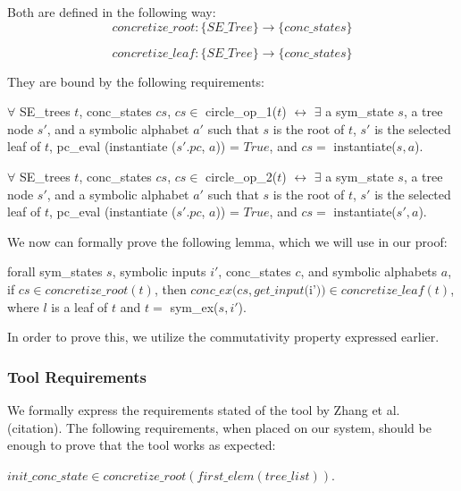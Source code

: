 Both are defined in the following way: 
$$concretize\_root : \{ SE\_Tree \} \rightarrow \{conc\_states\}$$

$$concretize\_leaf : \{ SE\_Tree \} \rightarrow \{conc\_states\}$$

They are bound by the following requirements:

\begin{definition}
$\forall$ SE\_trees $t$,  conc\_states $cs$,
$cs \in$ circle\_op\_1($t$) $\leftrightarrow$ 
$\exists$ a sym\_state $s$, a tree node $s'$, and a symbolic alphabet $a'$ such that
$s$ is the root of $t$, $s'$ is the selected leaf of $t$, 
pc\_eval (instantiate ($s'.pc$, $a$)) = $True$, and 
$cs =$ instantiate($s, a$).
\end{definition}

\begin{definition}
$\forall$ SE\_trees $t$,  conc\_states $cs$,
$cs \in$ circle\_op\_2($t$) $\leftrightarrow$ 
$\exists$ a sym\_state $s$, a tree node $s'$, and a symbolic alphabet $a'$ such that
$s$ is the root of $t$, $s'$ is the selected leaf of $t$, 
pc\_eval (instantiate ($s'.pc$, $a$)) = $True$, and 
$cs =$ instantiate($s', a$).
\end{definition}


We now can formally prove the following lemma, which we will use in our proof:
\begin{lemma} \label{cop}
forall sym\_states $s$, symbolic inputs $i'$, conc\_states $c$, and symbolic alphabets $a$,
if $cs \in concretize\_root(t)$,
then 
$conc\_ex(cs, get\_input ($i'$)) \in concretize\_leaf(t)$,
where $l$ is a leaf of $t$ and $t = $ sym\_ex($s, i'$).
\end{lemma}

In order to prove this, we utilize the commutativity property expressed earlier.


\subsubsection{Tool Requirements}
We formally express the requirements stated of the tool by Zhang et al. (citation).
The following requirements, when placed on our system, should be enough to prove that the tool works as expected:

\setcounter{property}{0}
\renewcommand{\theproperty}{Z.\arabic{property}}
\begin{property}
  \label{prop:startinit}
$init\_conc\_state \in concretize\_root(first\_elem (tree\_list))$.
\end{property}

